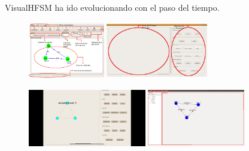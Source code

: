 \documentclass[notes,slidesec,a4]{seminar}
\begin{document}

\begin{hslide}

VisualHFSM ha ido evolucionando con el paso del tiempo.

\begin{minipage}[t]{0.5\textwidth}
\begin{center}
	\begin{figure}
		\includegraphics[height=2.5cm]{imgs/visualHFSM1.png}
		\includegraphics[height=2.5cm]{imgs/visualHFSM2.jpg}
	\end{figure}
\end{center}
\end{minipage} \hfill
\begin{minipage}[t]{0.5\textwidth}
\begin{center}
	\begin{figure}
		\includegraphics[height=2.5cm]{imgs/visualhfsm3.png}
		\includegraphics[height=2.5cm]{imgs/visualHFSM4.png}
	\end{figure}
\end{center}
\end{minipage}

\end{hslide}

\end{document}
